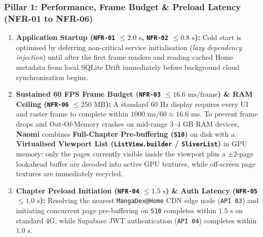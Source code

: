 \subsubsection{Pillar 1: Performance, Frame Budget \& Preload Latency (NFR-01 to NFR-06)}
\begin{enumerate}
    \item \textbf{Application Startup (\texttt{NFR-01} $\le 2.0\text{ s}$, \texttt{NFR-02} $\le 0.8\text{ s}$):} Cold start is optimised by deferring non-critical service initialisation (\textit{lazy dependency injection}) until after the first frame renders and reading cached Home metadata from local SQLite Drift immediately before background cloud synchronisation begins.
    \item \textbf{Sustained 60 FPS Frame Budget (\texttt{NFR-03} $\le 16.6\text{ ms/frame}$) \& RAM Ceiling (\texttt{NFR-06} $\le 250\text{ MB}$):} A standard $60\text{ Hz}$ display requires every UI and raster frame to complete within $1000\text{ ms} / 60 \approx 16.6\text{ ms}$. To prevent frame drops and Out-Of-Memory crashes on mid-range $3\text{--}4\text{ GB}$ RAM devices, \textbf{Naomi} combines \textbf{Full-Chapter Pre-buffering (\texttt{S10})} on disk with a \textbf{Virtualised Viewport List (\texttt{ListView.builder} / \texttt{SliverList})} in GPU memory: only the pages currently visible inside the viewport plus a $\pm 2$-page lookahead buffer are decoded into active GPU textures, while off-screen page textures are immediately recycled.
    \item \textbf{Chapter Preload Initiation (\texttt{NFR-04} $\le 1.5\text{ s}$) \& Auth Latency (\texttt{NFR-05} $\le 1.0\text{ s}$):} Resolving the nearest \texttt{MangaDex@Home} CDN edge node (\texttt{API 03}) and initiating concurrent page pre-buffering on \texttt{S10} completes within $1.5\text{ s}$ on standard 4G, while Supabase JWT authentication (\texttt{API 04}) completes within $1.0\text{ s}$.
\end{enumerate}

